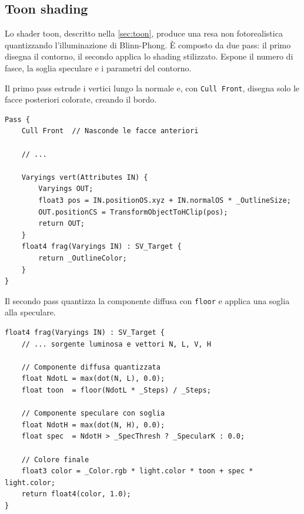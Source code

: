\documentclass[12pt,a4paper,twoside]{book}
\begin{document}
\begin{minipage}{\textwidth}

\subsection{Toon shading}
\label{subsec:impl-toon}

Lo shader toon, descritto nella \cref{sec:toon}, produce una resa non fotorealistica quantizzando l'illuminazione di Blinn-Phong. È composto da due pass: il primo disegna il contorno, il secondo applica lo shading stilizzato. Espone il numero di fasce, la soglia speculare e i parametri del contorno.

Il primo pass estrude i vertici lungo la normale e, con \texttt{Cull Front}, disegna solo le facce posteriori colorate, creando il bordo.

\begin{lstlisting}[style=hlsl,
    caption={Primo pass del toon shading: linea di contorno.},
    label={lst:toon-outline}]
Pass {
    Cull Front  // Nasconde le facce anteriori
    
    // ...
    
    Varyings vert(Attributes IN) {
        Varyings OUT;
        float3 pos = IN.positionOS.xyz + IN.normalOS * _OutlineSize;
        OUT.positionCS = TransformObjectToHClip(pos);
        return OUT;
    }
    float4 frag(Varyings IN) : SV_Target {
        return _OutlineColor;
    }
}
\end{lstlisting}

Il secondo pass quantizza la componente diffusa con \texttt{floor} e applica una soglia alla speculare.

\begin{lstlisting}[style=hlsl,
    caption={Secondo pass del toon shading: shading quantizzato.},
    label={lst:toon-frag}]
float4 frag(Varyings IN) : SV_Target {
    // ... sorgente luminosa e vettori N, L, V, H
    
    // Componente diffusa quantizzata
    float NdotL = max(dot(N, L), 0.0);
    float toon  = floor(NdotL * _Steps) / _Steps;
    
    // Componente speculare con soglia
    float NdotH = max(dot(N, H), 0.0);
    float spec  = NdotH > _SpecThresh ? _SpecularK : 0.0;
    
    // Colore finale
    float3 color = _Color.rgb * light.color * toon + spec * light.color;
    return float4(color, 1.0);
}
\end{lstlisting}
\end{minipage}
\end{document}

